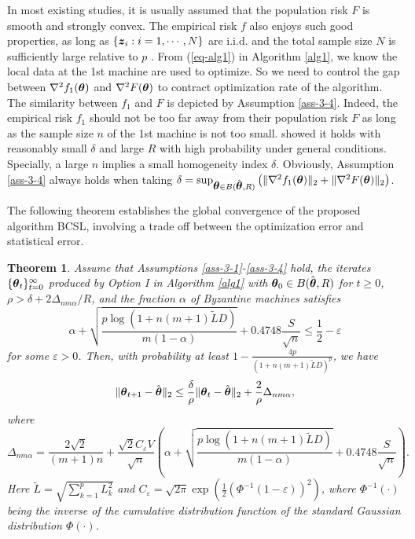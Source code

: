\documentclass[12pt,a4paper]{article}%
\newtheorem{thm}{Theorem}[section]
\newcommand{\be}{\begin{equation}}
\newcommand{\ee}{\end{equation}}
\newcommand \vc[1]{{\mbox{\boldmath${#1}$}}}
\newcommand \vtheta{\vc \theta}
\numberwithin{equation}{section}
\newcommand{\sbr}[1]{\left(#1\right)}        %
\begin{document}
In most existing studies, it is usually assumed that the population risk $F$ is smooth and strongly convex. The empirical risk $f$ also enjoys such good properties, as long as $\{\vc z_i: i=1,\cdots,N\}$ are i.i.d. and the total sample size $N$ is sufficiently large relative to $p$ \citep{FanGuoWang2019}. From (\ref{eq-alg1}) in Algorithm \ref{alg1}, we know the local data at the 1st  machine are used to optimize. So we need to control the gap between $\nabla^2f_1(\vtheta)$ and $\nabla^2F(\vtheta)$ to contract optimization rate of the algorithm. The similarity between $f_1$ and $F$ is depicted by Assumption \ref{ass-3-4}.
Indeed, the empirical risk $f_1$ should not be too far away from their population risk $F$ as long as the sample size $n$ of the 1st  machine is not too small. \cite{Meietal2018} showed it holds with reasonably small $\delta$ and large $R$ with high probability under general conditions. Specially, a large $n$ implies a small homogeneity index $\delta$. Obviously, Assumption \ref{ass-3-4} always holds when taking $\delta=\sup_{\vtheta\in B(\hat{\vtheta},R)}\sbr{\|\nabla^2f_1(\vtheta)\|_2+\|\nabla^2F(\vtheta)\|_2}$.


The following theorem establishes the global convergence of the proposed algorithm BCSL, involving a trade off between the optimization error  and statistical error.
\begin{thm}\label{thm1}
Assume that Assumptions \ref{ass-3-1}-\ref{ass-3-4} hold, the iterates $\{\vtheta_t\}_{t=0}^\infty$ produced by Option I in Algorithm \ref{alg1} with $\vtheta_0\in B(\hat{\vtheta}, R)$ for $t\geq0$, $\rho>\delta+2\Delta_{nm\alpha}/R$, and the fraction $\alpha$ of Byzantine machines satisfies
\be\label{eq3-0}
\alpha+\sqrt{\frac{p\log(1+n(m+1)\tilde{L}D)}{m(1-\alpha)}}+0.4748\frac{S}{\sqrt{n}}\leq \frac{1}{2}-\varepsilon
\ee
for some $\varepsilon>0$.
Then, with probability at least $1-\frac{4p}{(1+n(m+1)\tilde{L}D)^p}$, we have
$$\|\vtheta_{t+1}-\hat{\vtheta}\|_2\leq \frac{\delta}{\rho}\|\vtheta_{t}-\hat{\vtheta}\|_2+\frac{2}{\rho}\Delta_{nm\alpha},$$
where
$$\Delta_{nm\alpha}=\frac{2\sqrt{2}}{(m+1)n}+\frac{\sqrt{2}C_\varepsilon V}{\sqrt{n}}\sbr{\alpha+\sqrt{\frac{p\log(1+n(m+1)\tilde{L}D)}{m(1-\alpha)}}+0.4748\frac{S}{\sqrt{n}}}.$$
Here  $\tilde{L}=\sqrt{\sum_{k=1}^pL_k^2}$ and
$C_\varepsilon=\sqrt{2\pi}\exp\sbr{\frac{1}{2}(\Phi^{-1}(1-\varepsilon))^2}$,
where $\Phi^{-1}(\cdot)$ being the inverse of the cumulative distribution function of the standard Gaussian distribution $\Phi(\cdot)$.
\end{thm}
\end{document}
